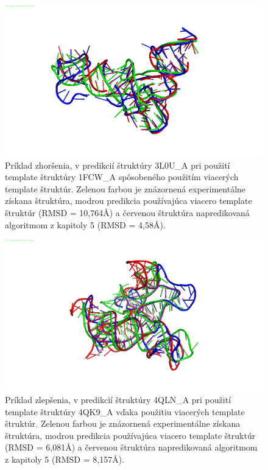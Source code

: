 \begin{figure}%
\includegraphics[width=\textwidth]{../img/loss}
\caption{Príklad zhoršenia, v predikcií štruktúry 3L0U\_A pri použití template štruktúry 1FCW\_A spôsobeného použitím viacerých template štruktúr. Zelenou farbou je znázornená experimentálne získana štruktúra, modrou predikcia používajúca viacero template štruktúr (RMSD = 10,764Å) a červenou štruktúra napredikovaná algoritmom z kapitoly 5 (RMSD = 4,58Å). }
\label{obr06.02}
\end{figure}

\begin{figure}%
\includegraphics[width=\textwidth]{../img/success}
\caption{Príklad zlepšenia, v predikcií štruktúry 4QLN\_A pri použití template štruktúry 4QK9\_A vďaka použitiu viacerých template štruktúr. Zelenou farbou je znázornená experimentálne získana štruktúra, modrou predikcia používajúca viacero template štruktúr (RMSD = 6,081Å) a červenou štruktúra napredikovaná algoritmom z kapitoly 5 (RMSD = 8,157Å). }
\label{obr06.01}
\end{figure}
